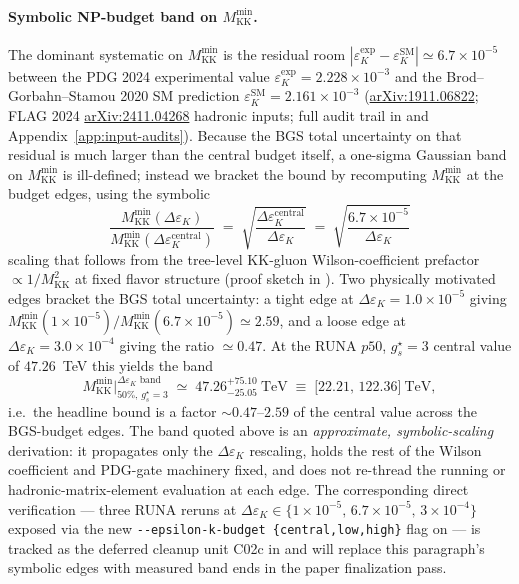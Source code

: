 \documentclass[11pt]{article}
\newcommand{\Mkk}{M_{\mathrm{KK}}}
\newcommand{\gs}{g_s^{\star}}
\newcommand{\eK}{\varepsilon_K}
\begin{document}
\paragraph{Symbolic NP-budget band on $\Mkk^{\min}$.}
\label{para:eps-k-budget-band}
The dominant systematic on $\Mkk^{\min}$ is the residual room
$|\eK^{\mathrm{exp}}-\eK^{\mathrm{SM}}|\simeq 6.7\times10^{-5}$
between the PDG 2024 experimental value
$\eK^{\mathrm{exp}}=2.228\times10^{-3}$ and the
Brod--Gorbahn--Stamou 2020 SM prediction
$\eK^{\mathrm{SM}}=2.161\times10^{-3}$
(\href{https://arxiv.org/abs/1911.06822}{arXiv:1911.06822};
FLAG 2024 \href{https://arxiv.org/abs/2411.04268}{arXiv:2411.04268}
hadronic inputs; full audit trail in
 and
Appendix~\ref{app:input-audits}). Because the BGS total uncertainty on
that residual is much larger than the central budget itself, a one-sigma
Gaussian band on $\Mkk^{\min}$ is ill-defined; instead we bracket the
bound by recomputing $\Mkk^{\min}$ at the budget edges, using the
symbolic
\[
  \frac{\Mkk^{\min}(\Delta\eK)}{\Mkk^{\min}(\Delta\eK^{\mathrm{central}})}
  \;=\;
  \sqrt{\frac{\Delta\eK^{\mathrm{central}}}{\Delta\eK}}
  \;=\;
  \sqrt{\frac{6.7\times10^{-5}}{\Delta\eK}}
\]
scaling that follows from the tree-level KK-gluon Wilson-coefficient
prefactor $\propto 1/\Mkk^2$ at fixed flavor structure (proof sketch in
). Two physically
motivated edges bracket the BGS total uncertainty: a tight edge at
$\Delta\eK=1.0\times10^{-5}$ giving
$\Mkk^{\min}(1\!\times\!10^{-5})/\Mkk^{\min}(6.7\!\times\!10^{-5})
\simeq 2.59$, and a loose edge at
$\Delta\eK=3.0\times10^{-4}$ giving the ratio $\simeq 0.47$. At the
RUNA $p50$, $\gs=3$ central value of $47.26$~TeV this yields the band
\[
  \Mkk^{\min}\bigl|_{50\%,\,\gs=3}^{\Delta\eK\text{ band}}
  \;\simeq\; 47.26^{+75.10}_{-25.05}\ \mathrm{TeV}
  \;\equiv\;
  \bigl[22.21,\,122.36\bigr]\ \mathrm{TeV},
\]
i.e.\ the headline bound is a factor $\sim 0.47$--$2.59$ of the central
value across the BGS-budget edges. The band quoted above is an
\emph{approximate, symbolic-scaling} derivation: it propagates only the
$\Delta\eK$ rescaling, holds the rest of the Wilson coefficient and
PDG-gate machinery fixed, and does not re-thread the running or
hadronic-matrix-element evaluation at each edge. The corresponding
direct verification --- three RUNA reruns at $\Delta\eK\in
\{1\!\times\!10^{-5},\,6.7\!\times\!10^{-5},\,3\!\times\!10^{-4}\}$
exposed via the new
\verb|--epsilon-k-budget {central,low,high}| flag on
 --- is tracked as the deferred cleanup
unit C02c in  and will replace this
paragraph's symbolic edges with measured band ends in the paper
finalization pass.
\end{document}

